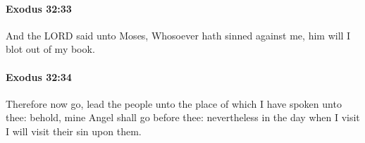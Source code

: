 		\paragraph{Exodus 32:33} %
			\label{EXODUS-32-33}

			And the LORD said unto Moses, Whosoever hath sinned against me, him will I blot out of my book.


		\paragraph{Exodus 32:34} %
			\label{EXODUS-32-34}

			Therefore now go, lead the people unto the place of which I have spoken unto thee: behold, mine Angel shall go before thee: nevertheless in the day when I visit I will visit their sin upon them.


